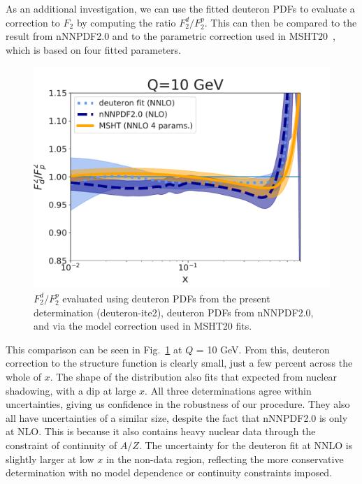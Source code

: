 As an additional investigation, we can use the fitted deuteron PDFs to evaluate a correction to $F_2$ by computing the ratio $F_2^d/F_2^p$. This can then be compared to the result from nNNPDF2.0 and to the parametric correction used in MSHT20~\cite{Bailey:2020ooq}, which is based on four fitted parameters. 
\begin{figure}[H]
  \begin{center}
      \includegraphics[width=0.8\linewidth]{nuclear/plots/newdeut_10.pdf}
    \caption{$F_2^d/F_2^p$ evaluated using deuteron PDFs from the present determination (deuteron-ite2), deuteron PDFs from nNNPDF2.0, and via the model correction used in MSHT20 fits.
    \label{fig:deutpdfcomp} }
    \end{center}
\end{figure}   
This comparison can be seen in Fig.~\ref{fig:deutpdfcomp} at $Q$ = 10 GeV. From this, deuteron correction to the structure function is clearly small, just a few percent across the whole of $x$. The shape of the distribution also fits that expected from nuclear shadowing, with a dip at large $x$. All three determinations agree within uncertainties, giving us confidence in the robustness of our procedure. They also all have uncertainties of a similar size, despite the fact that nNNPDF2.0 is only at NLO. This is because it also contains heavy nuclear data through the constraint of continuity of $A/Z$. The uncertainty for the deuteron fit at NNLO is slightly larger at low $x$ in the non-data region, reflecting the more conservative determination with no model dependence or continuity constraints imposed. 

